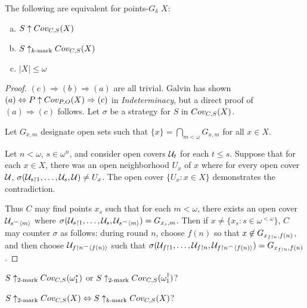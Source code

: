   \begin{theorem}
    The following are equivalent for points-$G_\delta$ $X$:
      \begin{enumerate}[(a)]
        \item $S\uparrow Cov_{C,S}(X)$
        \item $S\uparrow_{k\text{-mark}}Cov_{C,S}(X)$
        \item $|X|\leq\omega$
      \end{enumerate}
  \end{theorem}

  \begin{proof}
    $(c)\Rightarrow(b)\Rightarrow(a)$ are all trivial. Galvin has shown $(a) \Leftrightarrow P\uparrow Cov_{P,O}(X) \Rightarrow (c)$ in \textit{Indeterminacy}, but a direct proof of $(a)\Rightarrow(c)$ follows. Let $\sigma$ be a strategy for $S$ in $Cov_{C,S}(X)$.

    Let $G_{x,m}$ designate open sets such that $\{x\}=\bigcap_{m<\omega}G_{x,m}$ for all $x\in X$.

    Let $n<\omega$, $s\in\omega^{n}$, and consider open covers $\mathcal{U}_t$ for each $t\leq s$. Suppose that for each $x\in X$, there was an open neighborhood $U_x$ of $x$ where for every open cover $\mathcal{U}$, $\sigma(\mathcal{U}_{s\restriction 1},\dots,\mathcal{U}_{s},\mathcal{U})\not=U_x$. The open cover $\{U_x : x\in X\}$ demonstrates the contradiction.

    Thus $C$ may find points $x_s$ such that for each $m<\omega$, there exists an open cover $\mathcal{U}_{s^\frown\langle m\rangle}$ where $\sigma(\mathcal{U}_{s\restriction 1},\dots,\mathcal{U}_{s},\mathcal{U}_{s^\frown\langle m\rangle})=G_{x_s,m}$. Then if $x\not=\{x_s : s\in\omega^{<\omega}\}$, $C$ may counter $\sigma$ as follows: during round $n$, choose $f(n)$ so that $x\not\in G_{x_{f\restriction n},f(n)}$, and then choose $\mathcal{U}_{f\restriction n^\frown\langle f(n)\rangle}$ such that $\sigma(\mathcal{U}_{f\restriction 1},\dots,\mathcal{U}_{f\restriction n},\mathcal{U}_{f\restriction n^\frown\langle f(n)\rangle})=G_{x_{f\restriction n},f(n)}$.
  \end{proof} 

  \begin{question}
    $S\uparrow_{2\text{-mark}}Cov_{C,S}(\omega_1^*)$ or $S\uparrow_{2\text{-mark}}Cov_{C,S}(\omega_1^\dagger)$?
  \end{question}

  \begin{question}
    $S\uparrow_{2\text{-mark}}Cov_{C,S}(X)\Leftrightarrow S\uparrow_{k\text{-mark}}Cov_{C,S}(X)$?
  \end{question}

